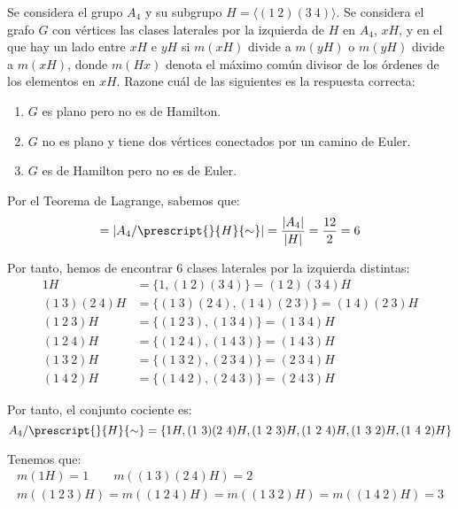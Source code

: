 \begin{ejercicio}\label{ej:1.38}
    Se considera el grupo $A_4$ y su subgrupo $H = \langle (1\ 2)(3\ 4) \rangle$. Se considera el grafo $G$ con vértices las clases laterales por la izquierda de $H$ en $A_4$, $xH$, y en el que hay un lado entre $xH$ e $yH$ si $m(xH)$ divide a $m(yH)$ o $m(yH)$ divide a $m(xH)$, donde $m(Hx)$ denota el máximo común divisor de los órdenes de los elementos en $xH$.
    Razone cuál de las siguientes es la respuesta correcta:
    \begin{enumerate}[label=$\alph*$)]   
        \item $G$ es plano pero no es de Hamilton.
        \item $G$ no es plano y tiene dos vértices conectados por un camino de Euler.
        \item $G$ es de Hamilton pero no es de Euler.
    \end{enumerate}

    Por el Teorema de Lagrange, sabemos que:
    \begin{equation*}
        [A_4:H]=\left|A_4/\prescript{}{H}{\sim}\right|=\frac{|A_4|}{|H|}=\frac{12}{2}=6
    \end{equation*}

    Por tanto, hemos de encontrar 6 clases laterales por la izquierda distintas:
    \begin{align*}
        1H &= \{1, (1\ 2)(3\ 4)\} = (1\ 2)(3\ 4)H\\
        (1\ 3)(2\ 4)H &= \{(1\ 3)(2\ 4), (1\ 4)(2\ 3)\} = (1\ 4)(2\ 3)H\\
        (1\ 2\ 3)H &= \{(1\ 2\ 3), (1\ 3\ 4)\} = (1\ 3\ 4)H\\
        (1\ 2\ 4)H &= \{(1\ 2\ 4), (1\ 4\ 3)\} = (1\ 4\ 3)H\\
        (1\ 3\ 2)H &= \{(1\ 3\ 2), (2\ 3\ 4)\} = (2\ 3\ 4)H\\
        (1\ 4\ 2)H &= \{(1\ 4\ 2), (2\ 4\ 3)\} = (2\ 4\ 3)H
    \end{align*}

    Por tanto, el conjunto cociente es:
    \begin{equation*}
        A_4/\prescript{}{H}{\sim}=\{1H, (1\ 3)(2\ 4)H, (1\ 2\ 3)H, (1\ 2\ 4)H, (1\ 3\ 2)H, (1\ 4\ 2)H\}
    \end{equation*}

    Tenemos que:
    \begin{gather*}
        m(1H)=1\qquad m((1\ 3)(2\ 4)H)=2\\
        m((1\ 2\ 3)H)=m((1\ 2\ 4)H)=m((1\ 3\ 2)H)=m((1\ 4\ 2)H)=3
    \end{gather*}


\end{ejercicio}
